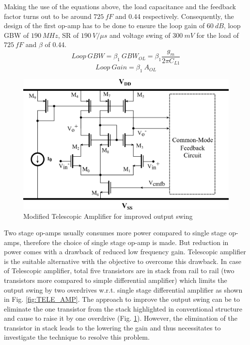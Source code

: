 Making the use of the equations above, the load capacitance and the feedback factor turns out to be around $725\ fF$ and 0.44 respectively. Consequently, the design of the first op-amp has to be done to ensure the loop gain of $60\ dB$, loop GBW of $190\ MHz$, SR of $190\ V/\mu s$ and voltage swing of $300\ mV$ for the load of $725\ fF$ and $\beta$ of 0.44. 
%
\begin{equation}
    Loop\ GBW = \beta_1 \ GBW_{OL} = \beta_1 \frac{g_m}{2\pi C_{L1}}
\end{equation}
%
%
\begin{equation}
    Loop\ Gain = \beta_1\ A_{OL}
\end{equation}
%
%
\begin{figure}[h]
\centering
\includegraphics[width=0.9\columnwidth]{Chap05/Figures/telescopic_m.png}
\caption{Modified Telescopic Amplifier for improved output swing}
\label{TELE_AMP1}
\end{figure}
%
Two stage op-amps usually consumes more power compared to single stage op-amps, therefore the choice of single stage op-amp is made. But reduction in power comes with a drawback of reduced low frequency gain. Telescopic amplifier is the suitable alternative with the objective to overcome this drawback. In case of Telescopic amplifier, total five transistors are in stack from rail to rail (two transistors more compared to simple differential amplifier) which limits the output swing by two overdrives w.r.t. single stage differential amplifier as shown in Fig. \ref{fig:TELE_AMP}. The approach to improve the output swing can be to eliminate the one transistor from the stack highlighted in conventional structure and cause to raise it by one overdrive (Fig. \ref{TELE_AMP1}). However, the elimination of the transistor in stack leads to the lowering the gain and thus necessitates to investigate the technique to resolve this problem.


